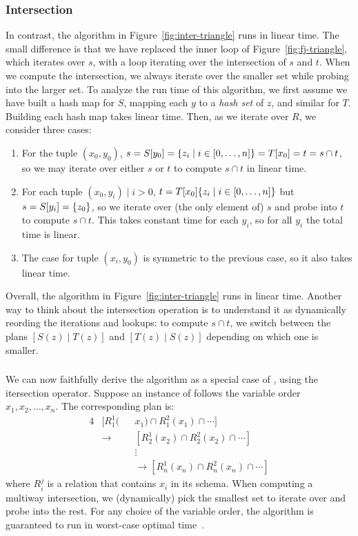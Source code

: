 \subsubsection{Intersection}
In contrast, the algorithm in Figure~\ref{fig:inter-triangle}
runs in linear time.
The small difference is that we have replaced the inner loop of
Figure~\ref{fig:fj-triangle}, which iterates over $s$,
with a loop iterating over the intersection of $s$ and $t$.
When we compute the intersection, we always iterate over the smaller
set while probing into the larger set.
To analyze the run time of this algorithm,
we first assume we have built a hash map for $S$,
mapping each $y$ to a {\em hash set} of $z$,
and similar for $T$.
Building each hash map takes linear time.
Then, as we iterate over $R$, we consider three cases:
\begin{enumerate}
  \item For the tuple $(x_0, y_0)$, $s = S[y_0] = \{{z_i}\mid{i \in [0, \ldots, n]}\} = T[x_0] = t = s \cap t$,
        so we may iterate over either $s$ or $t$ to compute $s \cap t$ in linear time.
  \item For each tuple $(x_0, y_i)\mid i > 0$, $t = T[x_0] \{{z_i}\mid{i \in [0, \ldots, n]}\}$ but
        $s = S[y_i] = \{z_0\}$, so we iterate over (the only element of) $s$
        and probe into $t$ to compute $s \cap t$.
        This takes constant time for each $y_i$, so for all $y_i$ the total time is linear.
  \item The case for tuple $(x_i, y_0)$ is symmetric to the previous case, so it also takes linear time.
\end{enumerate}
Overall, the algorithm in Figure~\ref{fig:inter-triangle} runs in linear time.
Another way to think about the intersection operation is to
understand it as dynamically reording the iterations and lookups:
to compute $s \cap t$, we switch between
the plans $[S(z) \mid T(z)]$ and $[T(z)\mid S(z)]$ depending on which one is smaller.

\subsubsection{\GJ}
We can now faithfully derive the \GJ algorithm as a special case of \FJ,
using the itersection operator.
Suppose an instance of \GJ follows the variable order $x_1, x_2, \ldots, x_n$.
The corresponding \FJ plan is:
\begin{alignat*}{4}
   & [R_1^1(     &  & x_1) \cap R_1^2(x_1) \cap \cdots]                    \\
   & \rightarrow &  & [R_2^1(x_2) \cap R_2^2(x_2) \cap \cdots]             \\
   &             &  & \vdots                                               \\
   &             &  & \rightarrow [R_n^1(x_n) \cap R_n^2(x_n) \cap \cdots]
\end{alignat*}
where $R_i^j$ is a relation that contains $x_i$ in its schema.
When computing a multiway intersection, we (dynamically) pick
the smallest set to iterate over and probe into the rest.
For any choice of the variable order,
the \GJ algorithm is guaranteed to run in worst-case
optimal time~\cite{DBLP:conf/icdt/Veldhuizen14,DBLP:conf/pods/000118,DBLP:conf/pods/NgoPRR12}.


